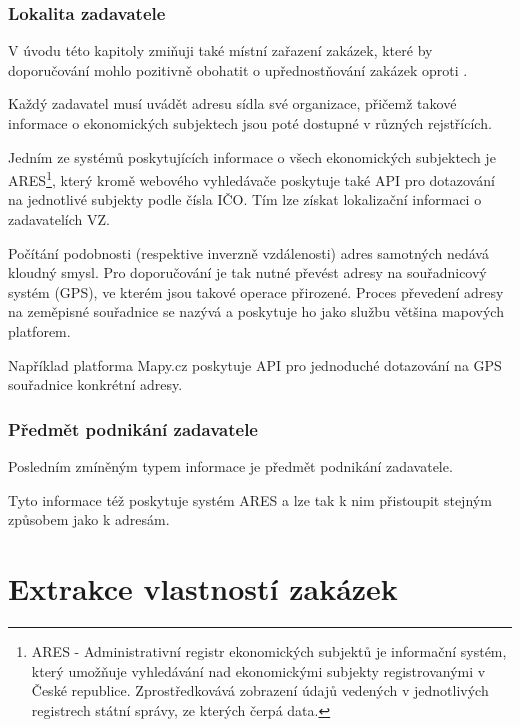 \documentclass[thesis=M,czech]{FITthesis}[2019/12/23]
\begin{document}
\subsection{Lokalita zadavatele}
\label{sec:data_locality}

V úvodu této kapitoly zmiňuji také místní zařazení zakázek, které by doporučování mohlo pozitivně obohatit o upřednostňování  zakázek oproti .

Každý zadavatel musí uvádět adresu sídla své organizace, přičemž takové informace o ekonomických subjektech jsou poté dostupné v různých rejstřících.

Jedním ze systémů poskytujících informace o všech ekonomických subjektech je ARES\footnote{ARES - Administrativní registr ekonomických subjektů je informační systém, který umožňuje vyhledávání nad ekonomickými subjekty registrovanými v České republice. Zprostředkovává zobrazení údajů vedených v jednotlivých registrech státní správy, ze kterých čerpá data\cite{ARES}.}, který kromě webového vyhledávače poskytuje také API pro dotazování na jednotlivé subjekty podle čísla IČO. Tím lze získat lokalizační informaci o zadavatelích VZ.

Počítání podobnosti (respektive inverzně vzdálenosti) adres samotných nedává kloudný smysl. Pro doporučování je tak nutné převést adresy na souřadnicový systém (GPS), ve kterém jsou takové operace přirozené.  Proces převedení adresy na zeměpisné souřadnice se nazývá \cite{geocoding} a poskytuje ho jako službu většina mapových platforem.

Například platforma Mapy.cz poskytuje API pro jednoduché dotazování na GPS souřadnice konkrétní adresy.

\subsection{Předmět podnikání zadavatele}
\label{sec:data_subsub}

Posledním zmíněným typem informace je předmět podnikání zadavatele.

Tyto informace též poskytuje systém ARES a lze tak k nim přistoupit stejným způsobem jako k adresám.

\chapter{Extrakce vlastností zakázek}
\end{document}
